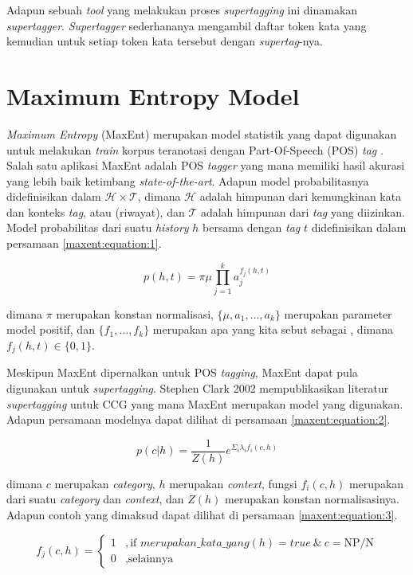 Adapun sebuah \textit{tool} yang melakukan proses \textit{supertagging} ini dinamakan
\textit{supertagger}.
\textit{Supertagger} sederhananya mengambil daftar token kata yang kemudian untuk setiap
token kata tersebut  dengan \textit{supertag}-nya.


\section{Maximum Entropy Model}
\textit{Maximum Entropy} (MaxEnt) merupakan model statistik yang dapat digunakan untuk
melakukan \textit{train} korpus teranotasi dengan Part-Of-Speech (POS) \textit{tag}
\cite{Ratnaparkhi96amaximum}.
Salah satu aplikasi MaxEnt adalah POS \textit{tagger} yang mana memiliki hasil akurasi
yang lebih baik ketimbang \textit{state-of-the-art}.
Adapun model probabilitasnya didefinisikan dalam $\mathcal{H}\times\mathcal{T}$,
dimana $\mathcal{H}$ adalah himpunan dari kemungkinan kata dan konteks \textit{tag},
atau  (riwayat), dan $\mathcal{T}$ adalah himpunan dari
\textit{tag} yang diizinkan.
Model probabilitas dari suatu \textit{history} $h$ bersama dengan \textit{tag} $t$
didefinisikan dalam persamaan \ref{maxent:equation:1}.

\begin{equation}\label{maxent:equation:1}
  p(h, t) = \pi\mu\prod_{j = 1}^{k} a_{j}^{f_{j}(h, t)}
\end{equation}

\noindent
dimana $\pi$ merupakan konstan normalisasi,
$\{\mu, a_1, \dots, a_k\}$ merupakan parameter model positif,
dan $\{f_1, \dots, f_k\}$ merupakan apa yang kita sebut sebagai
,
dimana $f_j(h, t) \in \{0, 1\}$.

Meskipun MaxEnt dipernalkan untuk POS \textit{tagging},
MaxEnt dapat pula digunakan untuk \textit{supertagging}.
Stephen Clark 2002 mempublikasikan literatur \textit{supertagging} untuk CCG yang
mana MaxEnt merupakan model yang digunakan.
Adapun persamaan modelnya dapat dilihat di persamaan \ref{maxent:equation:2}.

\begin{equation}\label{maxent:equation:2}
  p(c|h) = \frac{1}{Z(h)} e^{\Sigma_i \lambda_if_i(c, h)}
\end{equation}

\noindent
dimana $c$ merupakan \textit{category}, $h$ merupakan \textit{context},
fungsi $f_i(c, h)$ merupakan  dari suatu
\textit{category} dan \textit{context}, dan $Z(h)$ merupakan konstan normalisasinya.
Adapun contoh  yang dimaksud dapat dilihat di persamaan
\ref{maxent:equation:3}.

\begin{equation}\label{maxent:equation:3}
  f_j(c, h) =
  \begin{cases}
    1 &, \text{if } merupakan\_kata\_yang(h) = true\ \&\ c = \text{NP/N}\\
    0 &, \text{selainnya}
  \end{cases}
\end{equation}
